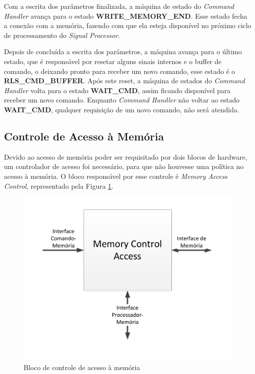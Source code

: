 \documentclass[monografia]{subfiles}
\begin{document}
			Com a escrita dos parâmetros finalizada, a máquina de estado do \textit{Command Handler} avança para o estado 
			\textbf{WRITE\_MEMORY\_END}. Esse estado fecha a conexão com a memória, fazendo com que ela esteja disponível no próximo ciclo de processamento
			do \textit{Signal Processor}. 

			Depois de concluída a escrita dos parâmetros, a máquina avança para o último estado, que é responsável por resetar 
			alguns sinais internos e o buffer de comando, o deixando pronto para receber um novo comando, esse estado é o 
			\textbf{RLS\_CMD\_BUFFER}. Após este reset, a máquina de estados do \textit{Command Handler} volta para o estado \textbf{WAIT\_CMD},
			assim ficando disponível para receber um novo comando. 
			Enquanto \textit{Command Handler} não voltar ao estado \textbf{WAIT\_CMD}, qualquer requisição de um novo comando, não será atendida.


	\subsection{Controle de Acesso à Memória}
	\label{sec:memoryAccessControllerSection}
		Devido ao acesso de memória poder ser requisitado por dois blocos de hardware, um controlador de acesso foi necessário, para que não houvesse
		uma política no acesso à memória. O bloco responsável por esse controle é \textit{Memory Access Control}, representado pela 
		Figura \ref{fig:memoryControlAccessBlock}.

			\begin{figure}[!h]
			\centering 
			\includegraphics[scale=0.6]{img/modulos/mod_memoryControlAccess.pdf}
			\caption{Bloco de controle de acesso à memória}
			\label{fig:memoryControlAccessBlock}
			\end{figure}
\end{document}
